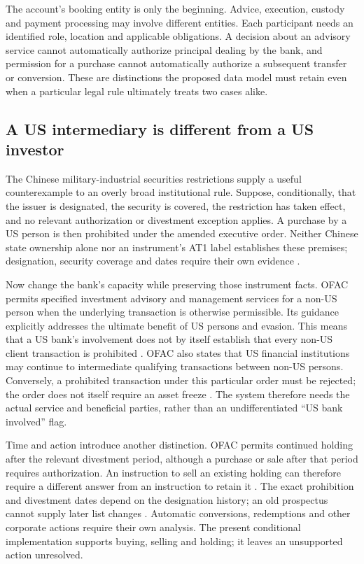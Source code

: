 The account's booking entity is only the beginning. Advice, execution, custody
and payment processing may involve different entities. Each participant needs
an identified role, location and applicable obligations. A decision about an
advisory service cannot automatically authorize principal dealing by the bank,
and permission for a purchase cannot automatically authorize a subsequent
transfer or conversion. These are distinctions the proposed data model must
retain even when a particular legal rule ultimately treats two cases alike.

\subsection{A US intermediary is different from a US investor}

The Chinese military-industrial securities restrictions supply a useful
counterexample to an overly broad institutional rule. Suppose, conditionally,
that the issuer is designated, the security is covered, the restriction has
taken effect, and no relevant authorization or divestment exception applies.
A purchase by a US person is then prohibited under the amended executive order.
Neither Chinese state ownership alone nor an instrument's AT1 label establishes
these premises; designation, security coverage and dates require their own
evidence \citep[replacement section 1]{eo140322021}.

Now change the bank's capacity while preserving those instrument facts. OFAC
permits specified investment advisory and management services for a non-US
person when the underlying transaction is otherwise permissible. Its guidance
explicitly addresses the ultimate benefit of US persons and evasion. This means
that a US bank's involvement does not by itself establish that every non-US
client transaction is prohibited \citep[FAQ 902]{ofaccmicservices2021}. OFAC also
states that US financial institutions may continue to intermediate qualifying
transactions between non-US persons. Conversely, a prohibited transaction under
this particular order must be rejected; the order does not itself require an
asset freeze \citep[FAQ 1048]{ofaccmicintermediation2022}. The system therefore
needs the actual service and beneficial parties, rather than an undifferentiated
``US bank involved'' flag.

Time and action introduce another distinction. OFAC permits continued holding
after the relevant divestment period, although a purchase or sale after that
period requires authorization. An instruction to sell an existing holding can
therefore require a different answer from an instruction to retain it
\citep[FAQ 1046]{ofaccmicholding2022}. The exact prohibition and divestment dates
depend on the designation history; an old prospectus cannot supply later list
changes \citep[FAQ 899]{ofaccmicdates2021}. Automatic conversions, redemptions
and other corporate actions require their own analysis. The present conditional
implementation supports buying, selling and holding; it leaves an unsupported
action unresolved.

